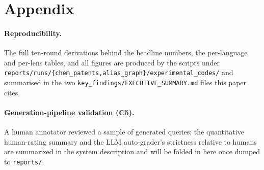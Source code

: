 \documentclass[11pt]{article}
\begin{document}


\appendix
\section{Appendix}

\paragraph{Reproducibility.}
The full ten-round derivations behind the headline numbers, the per-language and
per-lens tables, and all figures are produced by the scripts under
\texttt{reports/runs/\{chem\_patents,alias\_graph\}/experimental\_codes/} and
summarised in the two \texttt{key\_findings/EXECUTIVE\_SUMMARY.md} files this
paper cites.

\paragraph{Generation-pipeline validation (C5).}
A human annotator reviewed a sample of generated queries; the quantitative
human-rating summary and the LLM auto-grader's strictness relative to humans are
summarized in the system description and will be folded in here once dumped to
\texttt{reports/}.
\end{document}
